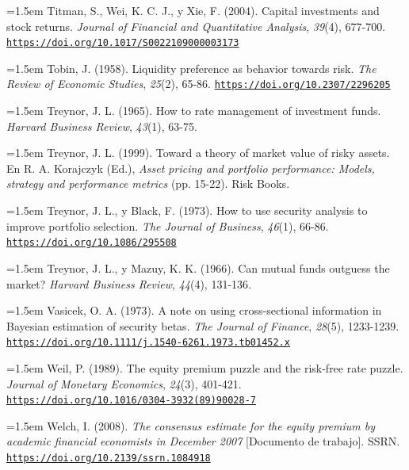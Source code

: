 \documentclass[10pt,a4paper]{article}
\begin{document}
\noindent\hangindent=1.5em Titman, S., Wei, K. C. J., y Xie, F. (2004). Capital investments and stock returns. \textit{Journal of Financial and Quantitative Analysis}, \textit{39}(4), 677-700. \href{https://doi.org/10.1017/S0022109000003173}{\nolinkurl{https://doi.org/10.1017/S0022109000003173}}

\noindent\hangindent=1.5em Tobin, J. (1958). Liquidity preference as behavior towards risk. \textit{The Review of Economic Studies}, \textit{25}(2), 65-86. \href{https://doi.org/10.2307/2296205}{\nolinkurl{https://doi.org/10.2307/2296205}}

\noindent\hangindent=1.5em Treynor, J. L. (1965). How to rate management of investment funds. \textit{Harvard Business Review}, \textit{43}(1), 63-75.

\noindent\hangindent=1.5em Treynor, J. L. (1999). Toward a theory of market value of risky assets. En R. A. Korajczyk (Ed.), \textit{Asset pricing and portfolio performance: Models, strategy and performance metrics} (pp. 15-22). Risk Books.

\noindent\hangindent=1.5em Treynor, J. L., y Black, F. (1973). How to use security analysis to improve portfolio selection. \textit{The Journal of Business}, \textit{46}(1), 66-86. \href{https://doi.org/10.1086/295508}{\nolinkurl{https://doi.org/10.1086/295508}}

\noindent\hangindent=1.5em Treynor, J. L., y Mazuy, K. K. (1966). Can mutual funds outguess the market? \textit{Harvard Business Review}, \textit{44}(4), 131-136.

\noindent\hangindent=1.5em Vasicek, O. A. (1973). A note on using cross-sectional information in Bayesian estimation of security betas. \textit{The Journal of Finance}, \textit{28}(5), 1233-1239. \href{https://doi.org/10.1111/j.1540-6261.1973.tb01452.x}{\nolinkurl{https://doi.org/10.1111/j.1540-6261.1973.tb01452.x}}

\noindent\hangindent=1.5em Weil, P. (1989). The equity premium puzzle and the risk-free rate puzzle. \textit{Journal of Monetary Economics}, \textit{24}(3), 401-421. \href{https://doi.org/10.1016/0304-3932(89)90028-7}{\nolinkurl{https://doi.org/10.1016/0304-3932(89)90028-7}}

\noindent\hangindent=1.5em Welch, I. (2008). \textit{The consensus estimate for the equity premium by academic financial economists in December 2007} [Documento de trabajo]. SSRN. \href{https://doi.org/10.2139/ssrn.1084918}{\nolinkurl{https://doi.org/10.2139/ssrn.1084918}}
\end{document}
